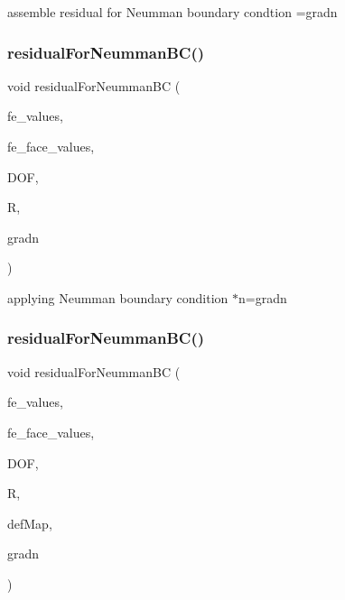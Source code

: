 assemble residual for Neumman boundary condtion =gradn \mbox{\label{class_residual_ad0e81fca1fe14909b80e709c1e93e393}} 
\subsubsection{\texorpdfstring{residual\+For\+Neumman\+B\+C()}{residualForNeummanBC()}\hspace{0.1cm}{\footnotesize\ttfamily [2/4]}}
{\footnotesize\ttfamily void residual\+For\+Neumman\+BC (\begin{DoxyParamCaption}\item[{const F\+E\+Values$<$ dim $>$ \&}]{fe\+\_\+values,  }\item[{const F\+E\+Face\+Values$<$ dim $>$ \&}]{fe\+\_\+face\+\_\+values,  }\item[{unsigned int}]{D\+OF,  }\item[{dealii\+::\+Table$<$ 1, T $>$ \&}]{R,  }\item[{dealii\+::\+Table$<$ 1, T $>$ \&}]{gradn }\end{DoxyParamCaption})}

applying Neumman boundary condition  $\ast$n=gradn \mbox{\label{class_residual_af2aedfc68848cd35cac392aad840db05}} 
\subsubsection{\texorpdfstring{residual\+For\+Neumman\+B\+C()}{residualForNeummanBC()}\hspace{0.1cm}{\footnotesize\ttfamily [3/4]}}
{\footnotesize\ttfamily void residual\+For\+Neumman\+BC (\begin{DoxyParamCaption}\item[{const F\+E\+Values$<$ dim $>$ \&}]{fe\+\_\+values,  }\item[{const F\+E\+Face\+Values$<$ dim $>$ \&}]{fe\+\_\+face\+\_\+values,  }\item[{unsigned int}]{D\+OF,  }\item[{dealii\+::\+Table$<$ 1, T $>$ \&}]{R,  }\item[{\mbox{\hyperlink{structdeformation_map}{deformation\+Map}}$<$ T, dim $>$ \&}]{def\+Map,  }\item[{dealii\+::\+Table$<$ 1, T $>$ \&}]{gradn }\end{DoxyParamCaption})}

